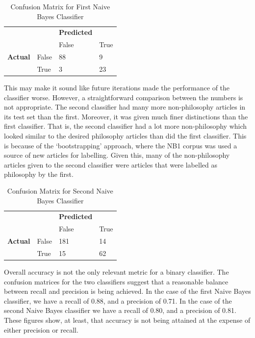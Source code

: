 \documentclass{article}
\begin{document}
\begin{table}[]
        \centering
        \footnotesize
        \begin{tabular}{ll|ll}
        & & \textbf{Predicted} & \\
        & & False & True \\
        \hline
        \textbf{Actual} & False & 88 & 9 \\
        & True & 3 & 23 \\
        \end{tabular}
        \caption{Confusion Matrix for First Naive Bayes Classifier}
        \label{t:nb1-confusion}
\end{table}

This may make it sound like future iterations made the performance of the classifier worse. However, a straightforward comparison between the numbers is not appropriate. The second classifier had many more non-philosophy articles in its test set than the first. Moreover, it was given much finer distinctions than the first classifier. That is, the second classifier had a lot more non-philosophy which looked similar to the desired philosophy articles than did the first classifier. This is because of the `bootstrapping' approach, where the NB1 corpus was used a source of new articles for labelling. Given this, many of the non-philosophy articles given to the second classifier were articles that were labelled as philosophy by the first.

\begin{table}[]
        \centering
        \footnotesize
        \begin{tabular}{ll|ll}
        & & \textbf{Predicted} & \\
        & & False & True \\
        \hline
        \textbf{Actual} & False & 181 & 14 \\
        & True & 15 & 62 \\
        \end{tabular}
        \caption{Confusion Matrix for Second Naive Bayes Classifier}
        \label{t:nb2-confusion}
\end{table}

Overall accuracy is not the only relevant metric for a binary classifier. The confusion matrices for the two classifiers suggest that a reasonable balance between recall and precision is being achieved. In the case of the first Naive Bayes classifier, we have a recall of 0.88, and a precision of 0.71. In the case of the second Naive Bayes classifier we have a recall of 0.80, and a precision of 0.81. These figures show, at least, that accuracy is not being attained at the expense of either precision or recall.
\end{document}
